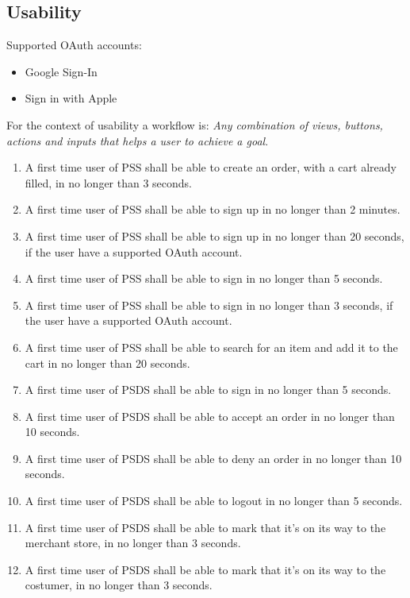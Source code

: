 \subsection{Usability}
Supported OAuth accounts: 
\begin{itemize}
    \item Google Sign-In
    \item Sign in with Apple
\end{itemize}
 
\noindent For the context of usability a workflow is: \textit{ Any combination 
of views, buttons, actions and inputs that helps a user to achieve a goal}.

\begin{enumerate}[label=USE-\arabic*]
    \item A first time user of PSS shall be able to create an order, with a 
    cart already filled, in no longer than 3 seconds.
    \item A first time user of PSS shall be able to sign up in no longer 
    than 2 minutes.
    \item A first time user of PSS shall be able to sign up in no longer 
    than 20 seconds, if the user have a supported OAuth account.
    \item A first time user of PSS shall be able to sign in no longer 
    than 5 seconds.
    \item A first time user of PSS shall be able to sign in no longer 
    than 3 seconds, if the user have a supported OAuth account.
    \item A first time user of PSS shall be able to search for an item and 
    add it to the cart in no longer than 20 seconds.
    \item A first time user of PSDS shall be able to sign in no longer 
    than 5 seconds.
    \item A first time user of PSDS shall be able to accept an order in no 
    longer than 10 seconds.
    \item A first time user of PSDS shall be able to deny an order in no 
    longer than 10 seconds.
    \item A first time user of PSDS shall be able to logout in no longer 
    than 5 seconds.
    \item A first time user of PSDS shall be able to mark that it’s on its 
    way to the merchant store, in no longer than 3 seconds.
    \item A first time user of PSDS shall be able to mark that it’s on its 
    way to the costumer, in no longer than 3 seconds.

\end{enumerate}
